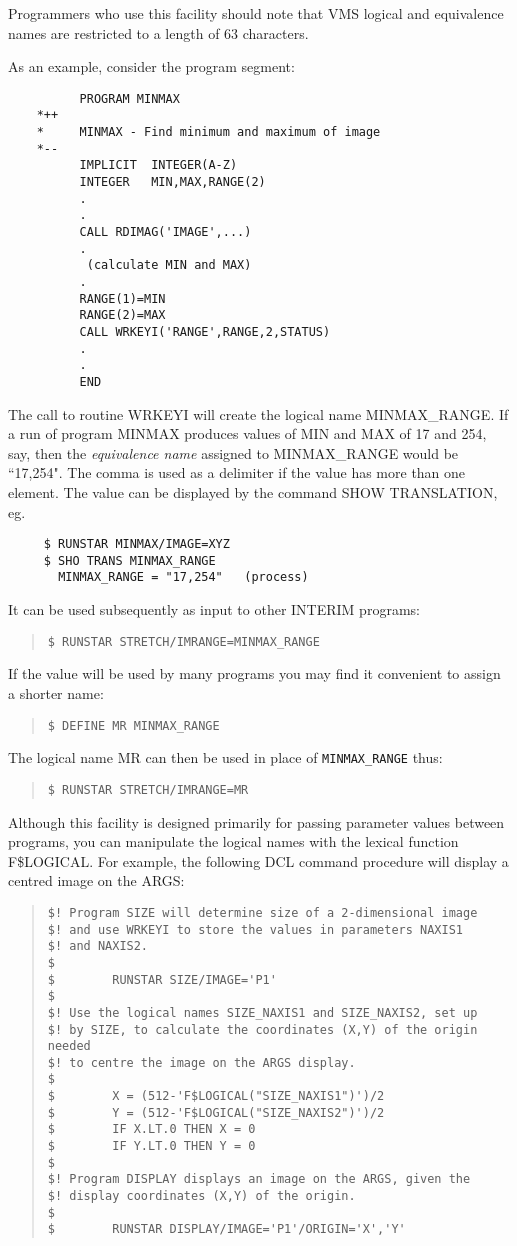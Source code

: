 \documentclass{article}
\begin{document}
Programmers who use this facility should note that VMS logical and equivalence
names are restricted to a length of 63 characters.

As an example, consider the program segment:
\begin{verbatim}
          PROGRAM MINMAX
    *++
    *     MINMAX - Find minimum and maximum of image
    *--
          IMPLICIT  INTEGER(A-Z)
          INTEGER   MIN,MAX,RANGE(2)
          .
          .
          CALL RDIMAG('IMAGE',...)
          .
           (calculate MIN and MAX)
          .
          RANGE(1)=MIN
          RANGE(2)=MAX
          CALL WRKEYI('RANGE',RANGE,2,STATUS)
          .
          .
          END
\end{verbatim}
The call to routine WRKEYI will create the logical name MINMAX\_RANGE.
If a run of program MINMAX produces values of MIN and MAX of 17 and 254, say,
then the {\em equivalence name} assigned to MINMAX\_RANGE would be ``17,254".
The comma is used as a delimiter if the value has more than one element.
The value can be displayed by the command SHOW TRANSLATION, eg.
\begin{verbatim}
     $ RUNSTAR MINMAX/IMAGE=XYZ
     $ SHO TRANS MINMAX_RANGE
       MINMAX_RANGE = "17,254"   (process)
\end{verbatim}
It can be used subsequently as input to other INTERIM programs:
\begin{quote}
{\tt \$ RUNSTAR STRETCH/IMRANGE=MINMAX\_RANGE}
\end{quote}
If the value will be used by many programs you may find it convenient to
assign a shorter name:
\begin{quote}
{\tt \$ DEFINE MR MINMAX\_RANGE}
\end{quote}
The logical name MR can then be used in place of {\tt MINMAX\_RANGE} thus:
\begin{quote}
{\tt \$ RUNSTAR STRETCH/IMRANGE=MR}
\end{quote}
Although this facility is designed primarily for passing parameter values
between programs, you can manipulate the logical names with the lexical
function F\$LOGICAL.
For example, the following DCL command procedure will display a centred image
on the ARGS:
\begin{quote}
\begin{verbatim}
$! Program SIZE will determine size of a 2-dimensional image
$! and use WRKEYI to store the values in parameters NAXIS1
$! and NAXIS2.
$
$        RUNSTAR SIZE/IMAGE='P1'
$
$! Use the logical names SIZE_NAXIS1 and SIZE_NAXIS2, set up
$! by SIZE, to calculate the coordinates (X,Y) of the origin needed
$! to centre the image on the ARGS display.
$
$        X = (512-'F$LOGICAL("SIZE_NAXIS1")')/2
$        Y = (512-'F$LOGICAL("SIZE_NAXIS2")')/2
$        IF X.LT.0 THEN X = 0
$        IF Y.LT.0 THEN Y = 0
$
$! Program DISPLAY displays an image on the ARGS, given the
$! display coordinates (X,Y) of the origin.
$
$        RUNSTAR DISPLAY/IMAGE='P1'/ORIGIN='X','Y'
\end{verbatim}
\end{quote}
\end{document}
